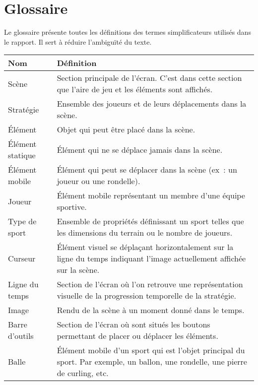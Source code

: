 \chapter{Glossaire}
\label{s:glossaire}

Le glossaire présente toutes les définitions des termes simplificateurs utilisés dans le rapport. Il sert à réduire l'ambiguïté du texte.\\

{\def\arraystretch{1.5}\tabcolsep=5pt
\begin{tabularx}{\textwidth}{|l|X|}
	\hline
	Nom & Définition \\
	\hline
	Scène 				& Section principale de l'écran. C'est dans cette section que l'aire de jeu et les éléments sont affichés. \\
	Stratégie  			& Ensemble des joueurs et de leurs déplacements dans la scène. \\
	Élément 			& Objet qui peut être placé dans la scène. \\
	Élément statique 	& Élément qui ne se déplace jamais dans la scène. \\
	Élément mobile 		& Élément qui peut se déplacer dans la scène (ex~: un joueur ou une rondelle). \\
	Joueur				& Élément mobile représentant un membre d'une équipe sportive. \\
	Type de sport		& Ensemble de propriétés définissant un sport telles que les dimensions du terrain ou le nombre de joueurs. \\
	Curseur 			& Élément visuel se déplaçant horizontalement sur la ligne du temps indiquant l'image actuellement affichée sur la scène. \\
	Ligne du temps 		& Section de l'écran où l'on retrouve une représentation visuelle de la progression temporelle de la stratégie. \\
	Image				& Rendu de la scène à un moment donné dans le temps. \\
	Barre d'outils 		& Section de l'écran où sont situés les boutons permettant de placer ou déplacer les éléments. \\
	Balle               & Élément mobile d'un sport qui est l'objet principal du sport. Par exemple, un ballon, une rondelle, une pierre de curling, etc. \\
	\hline
\end{tabularx}
}